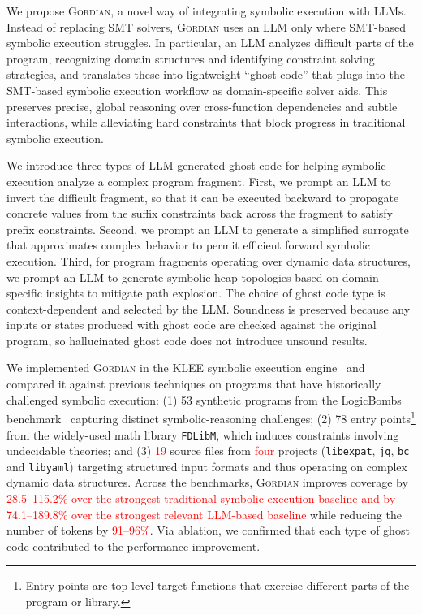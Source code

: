 \documentclass[acmsmall]{acmart}
\newcommand{\rev}[1]{\textcolor{red}{#1}}
\newcommand{\rev}[1]{#1}
\newcommand{\projName}{\textsc{Gordian}\xspace}
\theoremstyle{definition}
\begin{document}
We propose \projName, a novel way of integrating symbolic execution with LLMs. Instead of replacing SMT solvers, \projName uses an LLM only where SMT-based symbolic execution struggles. In particular, an LLM analyzes difficult parts of the program, recognizing domain structures and identifying constraint solving strategies, and translates these into lightweight ``ghost code'' that plugs into the SMT-based symbolic execution workflow as domain-specific solver aids. This preserves precise, global reasoning over cross-function dependencies and subtle interactions, while alleviating hard constraints that block progress in traditional symbolic execution.

We introduce three types of LLM-generated ghost code for helping symbolic execution analyze a complex program fragment. First, we prompt an LLM to invert the difficult fragment, so that it can be executed backward to propagate concrete values from the suffix constraints back across the fragment to satisfy prefix constraints. Second, we prompt an LLM to generate a simplified surrogate that approximates complex behavior to permit efficient forward symbolic execution. Third, for program fragments operating over dynamic data structures, we prompt an LLM to generate symbolic heap topologies based on domain-specific insights to mitigate path explosion. The choice of ghost code type is context-dependent and selected by the LLM. Soundness is preserved because any inputs or states produced with ghost code are checked against the original program, so hallucinated ghost code does not introduce unsound results.

We implemented \projName in the KLEE symbolic execution engine~\cite{klee} and compared it against previous techniques on programs that have historically challenged symbolic execution: (1) 53 synthetic programs from the LogicBombs benchmark~\cite{xu2018benchmarking} capturing distinct symbolic-reasoning challenges; (2) 78 entry points\footnote{Entry points are top-level target functions that exercise different parts of the program or library.} from the widely-used math library \texttt{FDLibM}, which induces constraints involving undecidable theories; and (3) \rev{19} source files from \rev{four} projects (\texttt{libexpat}, \texttt{jq}, \texttt{bc} and \texttt{libyaml}) targeting structured input formats and thus operating on complex dynamic data structures. Across the benchmarks, \projName{} improves coverage by \rev{28.5--115.2\% over the strongest traditional symbolic-execution baseline
and by 74.1--189.8\% over the strongest relevant LLM-based baseline} while reducing the number of tokens by \rev{91--96\%}. Via ablation, we confirmed that each type of ghost code contributed to the performance improvement.
\end{document}
